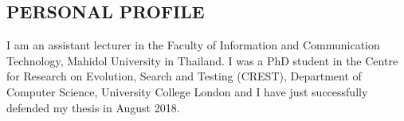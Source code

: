 \documentclass[margin, 10pt]{res} %
\begin{document}
\begin{resume}

 



\section{PERSONAL PROFILE}  

I am an assistant lecturer in the Faculty of Information and Communication Technology, Mahidol University in Thailand. I was a PhD student in the Centre for Research on Evolution, Search and Testing (CREST), Department of Computer Science, University College London and I have just successfully defended my thesis in August 2018. 





\end{resume}
\end{document}
